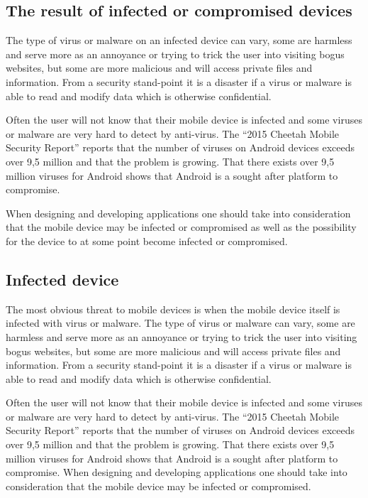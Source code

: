 \subsection{The result of infected or compromised devices}
The type of virus or malware on an infected device can vary, some are harmless and serve more as an annoyance or trying to trick the user into visiting bogus websites, but some are more malicious and will access private files and information. From a security stand-point it is a disaster if a virus or malware is able to read and modify data which is otherwise confidential.

Often the user will not know that their mobile device is infected and some viruses or malware are very hard to detect by anti-virus. The ``2015 Cheetah Mobile Security Report'' \cite{cheetahSec} reports that the number of viruses on Android devices exceeds over 9,5 million and that the problem is growing. That there exists over 9,5 million viruses for Android shows that Android is a sought after platform to compromise.

When designing and developing applications one should take into consideration that the mobile device may be infected or compromised as well as the possibility for the device to at some point become infected or compromised.


\iffalse %


\subsection{Infected device}
The most obvious threat to mobile devices is when the mobile device itself is infected with virus or malware. The type of virus or malware can vary, some are harmless and serve more as an annoyance or trying to trick the user into visiting bogus websites, but some are more malicious and will access private files and information. From a security stand-point it is a disaster if a virus or malware is able to read and modify data which is otherwise confidential.

Often the user will not know that their mobile device is infected and some viruses or malware are very hard to detect by anti-virus. The ``2015 Cheetah Mobile Security Report'' \cite{cheetahSec} reports that the number of viruses on Android devices exceeds over 9,5 million and that the problem is growing. That there exists over 9,5 million viruses for Android shows that Android is a sought after platform to compromise. When designing and developing applications one should take into consideration that the mobile device may be infected or compromised.


